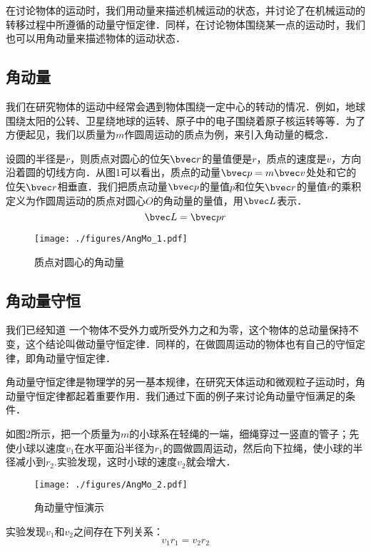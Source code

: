 
\begin{issues}
\issueTODO
\end{issues}

在讨论物体的运动时，我们用动量来描述机械运动的状态，并讨论了在机械运动的转移过程中所遵循的动量守恒定律．同样，在讨论物体围绕某一点的运动时，我们也可以用角动量来描述物体的运动状态．
\subsection{角动量}
我们在研究物体的运动中经常会遇到物体围绕一定中心的转动的情况．例如，地球围绕太阳的公转、卫星绕地球的运转、原子中的电子围绕着原子核运转等等．为了方便起见，我们以质量为$m$作圆周运动的质点为例，来引入角动量的概念．

设圆的半径是$r$，则质点对圆心的位矢$\bvec r$的量值便是$r$，质点的速度是$v$，方向沿着圆的切线方向．从图1可以看出，质点的动量$\bvec p = m\bvec v$处处和它的位矢$\bvec r$相垂直．我们把质点动量$\bvec p$的量值$p$和位矢$\bvec r$的量值$r$的乘积定义为作圆周运动的质点对圆心$O$的角动量的量值，用$\bvec L$表示．
\begin{equation}
\bvec L = \bvec p r
\end{equation}
\begin{figure}[ht]
\centering
\texttt{[image: ./figures/AngMo\_1.pdf]}
\caption{质点对圆心的角动量} \label{AngMo_fig1}
\end{figure}
\subsection{角动量守恒}
我们已经知道 一个物体不受外力或所受外力之和为零，这个物体的总动量保持不变，这个结论叫做动量守恒定律．同样的，在做圆周运动的物体也有自己的守恒定律，即角动量守恒定律．

角动量守恒定律是物理学的另一基本规律，在研究天体运动和微观粒子运动时，角动量守恒定律都起着重要作用．我们通过下面的例子来讨论角动量守恒满足的条件．

如图2所示，把一个质量为$m$的小球系在轻绳的一端，细绳穿过一竖直的管子；先使小球以速度$v_1$在水平面沿半径为$r_1$的圆做圆周运动，然后向下拉绳，使小球的半径减小到$r_2$.实验发现，这时小球的速度$v_2$就会增大．
\begin{figure}[ht]
\centering
\texttt{[image: ./figures/AngMo\_2.pdf]}
\caption{角动量守恒演示} \label{AngMo_fig2}
\end{figure}

实验发现$v_1$和$v_2$之间存在下列关系：
\begin{equation}
v_1r_1=v_2r_2
\end{equation}

